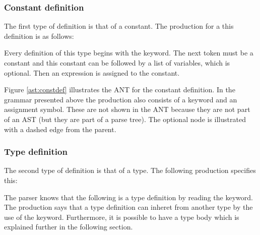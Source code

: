 \subsubsection{Constant definition}
The first type of definition is that of a constant. The production for a
this definition is as follows:

\begin{ebnf}
\end{ebnf}

Every definition of this type begins with the  keyword. The next
token must be a constant and this constant can be followed by a list of
variables, which is optional. Then an expression is assigned to the constant.



Figure \ref{ast:constdef} illustrates the ANT for the constant definition. In
the grammar presented above the production also consists of a keyword and an
assignment symbol. These are not shown in the ANT because they are not part 
of an AST (but they are part of a parse tree). The optional node is illustrated 
with a dashed edge from the parent.

\subsubsection{Type definition}

The second type of definition is that of a type. The following production
specifies this:

\begin{ebnf}
\end{ebnf}


The parser knows that the following is a type definition by reading the
 keyword. The production says that a type definition can inheret from
another type by the use of the  keyword. Furthermore, it is
possible to have a type body which is explained further in the following
section.



